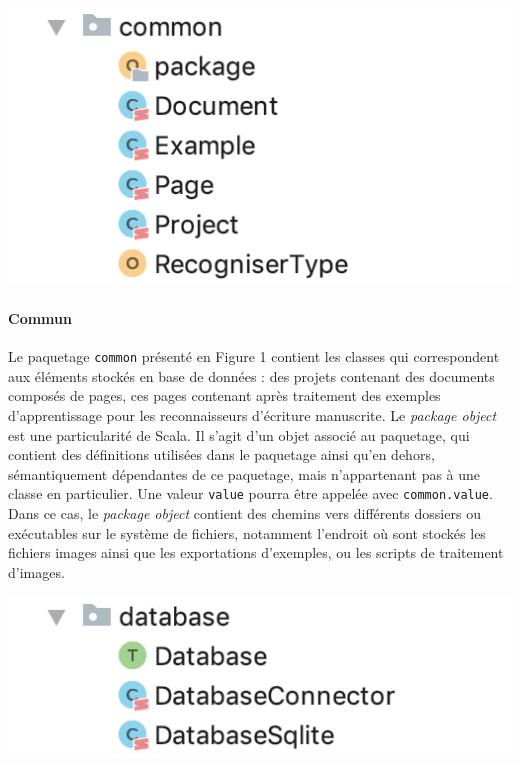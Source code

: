 \begin{mdframed}[frametitle={Figure 1 : Paquetage \texttt{common}}, innerbottommargin=10]
\begin{center}
\includegraphics[scale=0.7]{assets/common.png}
\end{center}
\end{mdframed}

\paragraph{Commun}
Le paquetage \texttt{common} présenté en Figure 1 contient les classes qui correspondent aux éléments stockés en base de données : des projets contenant des documents composés de pages, ces pages contenant après traitement des exemples d'apprentissage pour les reconnaisseurs d'écriture manuscrite. Le \textit{package object} est une particularité de Scala. Il s'agit d'un objet associé au paquetage, qui contient des définitions utilisées dans le paquetage ainsi qu'en dehors, sémantiquement dépendantes de ce paquetage, mais n'appartenant pas à une classe en particulier. Une valeur \texttt{value} pourra être appelée avec \texttt{common.value}. Dans ce cas, le \textit{package object} contient des chemins vers différents dossiers ou exécutables sur le système de fichiers, notamment l'endroit où sont stockés les fichiers images ainsi que les exportations d'exemples, ou les scripts de traitement d'images.

\begin{mdframed}[frametitle={Figure 1 : Paquetage \texttt{database}}, innerbottommargin=10]
\begin{center}
\includegraphics[scale=0.7]{assets/database.png}
\end{center}
\end{mdframed}

